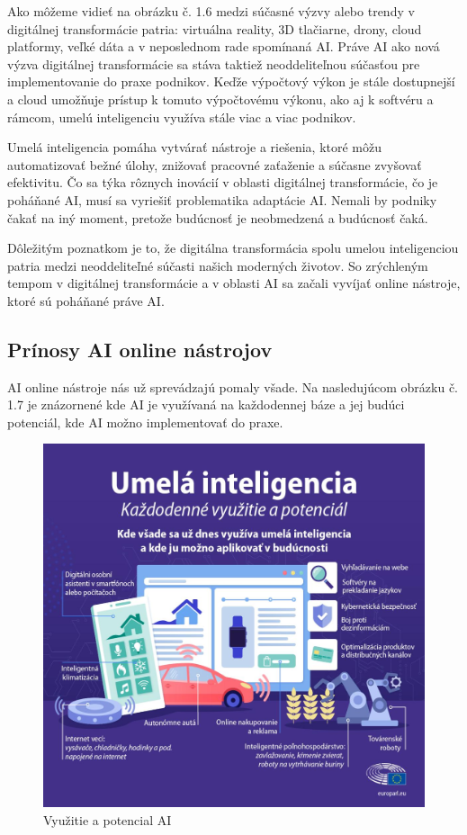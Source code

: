 Ako môžeme vidieť na obrázku č. 1.6 medzi súčasné výzvy alebo trendy v digitálnej transformácie patria: virtuálna reality, 3D tlačiarne, drony, cloud platformy, veľké dáta a v neposlednom rade spomínaná AI. Práve AI ako nová výzva digitálnej transformácie sa stáva taktiež neoddeliteľnou súčasťou pre implementovanie do praxe podnikov.  Keďže výpočtový výkon je stále dostupnejší a cloud umožňuje prístup k tomuto výpočtovému výkonu, ako aj k softvéru a rámcom, umelú inteligenciu využíva stále viac a viac podnikov. \cite{holmstrom2022}
\par Umelá inteligencia pomáha vytvárať nástroje a riešenia, ktoré môžu automatizovať bežné úlohy, znižovať pracovné zaťaženie a súčasne zvyšovať efektivitu.  Čo sa týka rôznych inovácií v oblasti digitálnej transformácie, čo je poháňané AI, musí sa vyriešiť problematika adaptácie AI.  Nemali by podniky čakať na iný moment, pretože budúcnosť je neobmedzená a budúcnosť čaká. \cite{emea_digital_transformation_framework}
\par Dôležitým poznatkom je to, že digitálna transformácia spolu umelou inteligenciou patria medzi neoddeliteľné súčasti našich moderných životov. So zrýchleným tempom v digitálnej transformácie a v oblasti AI sa začali vyvíjať online nástroje, ktoré sú poháňané práve AI. 




\subsection{Prínosy AI online nástrojov}

AI online nástroje nás už sprevádzajú pomaly všade. Na nasledujúcom obrázku č. 1.7 je znázornené kde AI je využívaná na každodennej báze a jej budúci potenciál, kde AI možno implementovať do praxe.

\begin{figure}[!ht]
    \centering
    \includegraphics[width=.9\textwidth]{figures/vyuzitie-a-potencia-ai.png}
    \caption{Využitie a potencial AI}
\end{figure}


